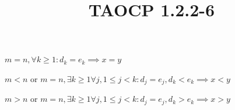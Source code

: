 \documentclass{article}
\title{TAOCP 1.2.2\mbox{-}6}
\begin{document}
\maketitle

\( m = n, \forall k \geq 1: d_{k} = e_{k} \implies x = y \)

\( m < n \) or \( m = n, \exists k \geq 1 \forall j, 1 \leq j < k: d_{j} = e_{j}, d_{k} < e_{k} \implies x < y \)

\( m > n \) or \( m = n, \exists k \geq 1 \forall j, 1 \leq j < k: d_{j} = e_{j}, d_{k} > e_{k} \implies x > y \)
\end{document}
